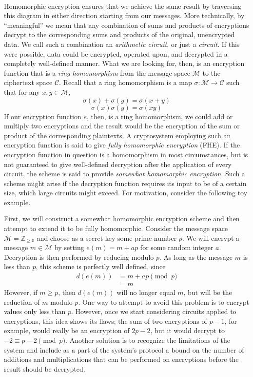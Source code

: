 \documentclass[11pt]{report}
\newcommand{\Z}{\mathbb{Z}}
\newcommand{\M}{\mathcal{M}}
\begin{document}
\

Homomorphic encryption ensures that we achieve the same result by traversing this diagram in either direction starting from our messages. More technically, by ``meaningful'' we mean that any combination of sums and products of encryptions decrypt to the corresponding sums and products of the original, unencrypted data. We call such a combination an \emph{arithmetic circuit}, or just a \emph{circuit}. If this were possible, data could be encrypted, operated upon, and decrypted in a completely well-defined manner. What we are looking for, then, is an encryption function that is a \emph{ring homomorphism} from the message space $\M$ to the ciphertext space $\mathcal{C}$. Recall that a ring homomorphism is a map $\sigma: \M \rightarrow \mathcal{C}$ such that for any $x,y\in \M$, \[\sigma(x)+\sigma(y) = \sigma(x+y)\] \[\sigma(x) \sigma(y) = \sigma(xy)\] If our encryption function $e$, then, is a ring homomorphism, we could add or multiply two encryptions and the result would be the encryption of the sum or product of the corresponding plaintexts. A cryptosystem employing such an encryption function is said to give \emph{fully homomorphic encryption} (FHE). If the encryption function in question is a homomorphism in most circumstances, but is not guaranteed to give well-defined decryption after the application of every circuit, the scheme is said to provide \emph{somewhat homomorphic encryption}. Such a scheme might arise if the decryption function requires its input to be of a certain size, which large circuits might exceed. For motivation, consider the following toy example.

\label{Example2}First, we will construct a somewhat homomorphic encryption scheme and then attempt to extend it to be fully homomorphic. Consider the message space $\M = \Z_{\geq 0}$ and choose as a secret key some prime number $p$. We will encrypt a message $m\in \M$ by setting $e(m) = m+ap$ for some random integer $a$. Decryption is then performed by reducing modulo $p$. As long as the message $m$ is less than $p$, this scheme is perfectly well defined, since
\begin{align*}
d(e(m)) &= m+ap \pmod{p}\\
              &= m
\end{align*}
However, if $m\geq p$, then $d(e(m))$ will no longer equal $m$, but will be the reduction of $m$ modulo $p$. One way to attempt to avoid this problem is to encrypt values only less than $p$. However, once we start considering circuits applied to encryptions, this idea shows its flaws; the sum of two encryptions of $p-1$, for example, would really be an encryption of $2p-2$, but it would decrypt to $-2 \equiv p-2 \pmod{p}$. Another solution is to recognize the limitations of the system and include as a part of the system's protocol a bound on the number of additions and multiplications that can be performed on encryptions before the result should be decrypted. 
\end{document}
